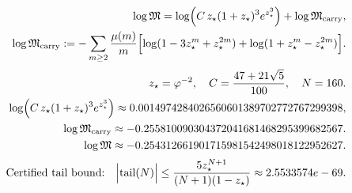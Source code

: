 \[
\begin{aligned}
\log\mathfrak{M}=\log\Bigl(C\,z_\star(1+z_\star)^3 e^{z_\star^3}\Bigr)+\log\mathfrak{M}_{\mathrm{carry}},
\\
\log\mathfrak{M}_{\mathrm{carry}}:=-\sum_{m\ge 2}\frac{\mu(m)}{m}\Bigl[\log(1-3z_\star^{m}+z_\star^{2m})+\log(1+z_\star^{m}-z_\star^{2m})\Bigr].
\\[2pt]
z_\star=\varphi^{-2},\quad C=\frac{47+21\sqrt5}{100},\quad N=160.
\\
\log\Bigl(C\,z_\star(1+z_\star)^3 e^{z_\star^3}\Bigr)\approx 0.0014974284026560601389702772767299398,
\\
\log\mathfrak{M}_{\mathrm{carry}}\approx -0.255810090304372041681468295399682567.
\\
\log\mathfrak{M}\approx -0.254312661901715981542498018122952627.
\\[2pt]
\text{Certified tail bound:}\quad\Bigl|\mathrm{tail}(N)\Bigr|\le \frac{5 z_\star^{N+1}}{(N+1)(1-z_\star)}\approx 2.5533574e-69.
\end{aligned}
\]
